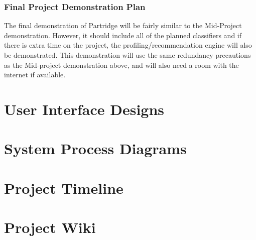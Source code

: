 \documentclass[12pt,a4paper]{article}
\begin{document}
\subsubsection{ Final Project Demonstration Plan}

The final demonstration of Partridge will be fairly similar to the Mid-Project
demonstration. However, it should include all of the planned classifiers and if
there is extra time on the project, the profiling/recommendation engine will
also be demonstrated. This demonstration will use the same redundancy
precautions as the Mid-project demonstration above, and will also need a room
with the internet if available.

\appendix
\section{User Interface Designs}
\label{sec:ui_designs}

\section{System Process Diagrams}
\label{sec:system_diagrams}


\section{Project Timeline}
\label{sec:timeline}

\section{Project Wiki}
\label{sec:wiki}




\end{document}
